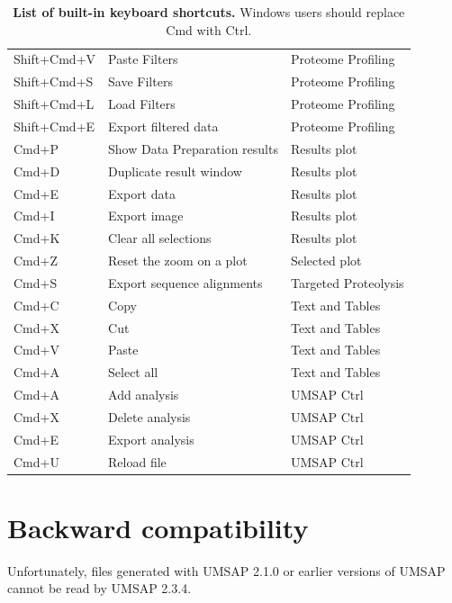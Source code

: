 \begin{table}[h!]
\begin{tabular}{l l l}
        Shift+Cmd+V&Paste Filters                      &Proteome Profiling\\
        Shift+Cmd+S&Save Filters                       &Proteome Profiling\\
        Shift+Cmd+L&Load Filters                       &Proteome Profiling\\
        Shift+Cmd+E&Export filtered data               &Proteome Profiling\\
        Cmd+P      &Show Data Preparation results      &Results plot\\
        Cmd+D      &Duplicate result window            &Results plot\\
        Cmd+E      &Export data                        &Results plot\\
        Cmd+I      &Export image                       &Results plot\\
        Cmd+K      &Clear all selections               &Results plot\\
        Cmd+Z      &Reset the zoom       on a plot     &Selected plot\\
        Cmd+S      &Export sequence alignments         &Targeted Proteolysis\\
        Cmd+C      &Copy                               &Text and Tables\\
        Cmd+X      &Cut                                &Text and Tables\\
        Cmd+V      &Paste                              &Text and Tables\\
        Cmd+A      &Select all                         &Text and Tables\\
        Cmd+A      &Add analysis                       &UMSAP Ctrl\\
        Cmd+X      &Delete analysis                    &UMSAP Ctrl\\
        Cmd+E      &Export analysis                    &UMSAP Ctrl\\
        Cmd+U      &Reload file                        &UMSAP Ctrl\\
        \hline
    \end{tabular}
    \caption[List of built-in keyboard shortcuts]{\textbf{List of built-in keyboard
    shortcuts.} Windows users should replace Cmd with Ctrl.}
    \label{table:shortcuts}
\end{table}

\section{Backward compatibility}
\label{sec:backwardCompatibility}

Unfortunately, files generated with UMSAP 2.1.0 or earlier versions of UMSAP
cannot be read by UMSAP 2.3.4.